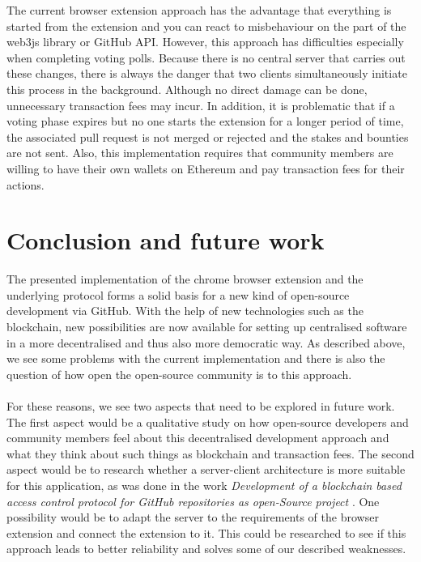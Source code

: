 \documentclass[sigconf]{acmart}
\begin{document}
The current browser extension approach has the advantage that everything is started from the extension and you can react to misbehaviour 
on the part of the web3js library or GitHub API. However, this approach has difficulties especially when completing voting polls.
Because there is no central server that carries out these changes, there is always the danger that two clients simultaneously initiate 
this process in the background. Although no direct damage can be done, unnecessary transaction fees may incur. In addition, it is 
problematic that if a voting phase expires but no one starts the extension for a longer period of time, the associated pull request is not 
merged or rejected and the stakes and bounties are not sent. Also, this implementation requires that community members are willing to 
have their own wallets on Ethereum and pay transaction fees for their actions.

\section{Conclusion and future work}
The presented implementation of the chrome browser extension and the underlying protocol forms a solid basis for a new kind of 
open-source development via GitHub. With the help of new technologies such as the blockchain, new possibilities are now available 
for setting up centralised software in a more decentralised and thus also more democratic way. As described above, we see some 
problems with the current implementation and there is also the question of how open the open-source community is to this approach. \\ \\
For these reasons, we see two aspects that need to be explored in future work. The first aspect would be a qualitative study on how 
open-source developers and community members feel about this decentralised development approach and what they think about such
 things as blockchain and transaction fees. The second aspect would be to research whether a server-client architecture is more 
suitable for this application, as was done in the work \textit{Development of a blockchain based access control protocol for 
GitHub repositories as open-Source project} \cite{ulrich2020dev}. One possibility would be to adapt the server to the requirements
of the browser extension and connect the extension to it. This could be researched to see if this approach leads to better reliability 
and solves some of our described weaknesses.




\appendix
\end{document}
